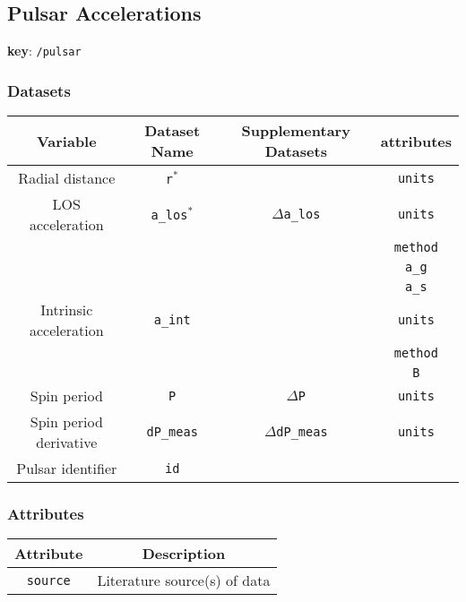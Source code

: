 \subsection{Pulsar Accelerations}

\textbf{key}: \texttt{/pulsar}

\subsubsection{Datasets}

\begin{center}
\begin{tabular}{ | c | c | c | c | }
    \hline
    Variable & Dataset Name & Supplementary Datasets &  attributes \\
    \hline\hline
    Radial distance & \texttt{r\(^*\)} & & \texttt{units} \\
    \hline
    LOS acceleration & \texttt{a\_los\(^*\)} & \texttt{\(\Delta\)a\_los} &
    \texttt{units}\\ &&&\texttt{method}\\ &&&\texttt{a\_g}\\ &&&\texttt{a\_s}\\
    \hline
    Intrinsic acceleration & \texttt{a\_int} & & 
    \texttt{units} \\ & & & \texttt{method} \\ & & & \texttt{B} \\
    \hline
    Spin period & \texttt{P} & \texttt{\(\Delta\)P} & \texttt{units} \\
    \hline
    Spin period derivative & \texttt{dP\_meas} & \texttt{\(\Delta\)dP\_meas} &
    \texttt{units} \\
    \hline
    Pulsar identifier & \texttt{id} & & \\
    \hline
\end{tabular}
\end{center}

\subsubsection{Attributes}


\begin{center}
\begin{tabular}{ | c | c | }
    \hline
    Attribute & Description \\
    \hline\hline
    \texttt{source} & Literature source(s) of data \\
    \hline
\end{tabular}
\end{center}
